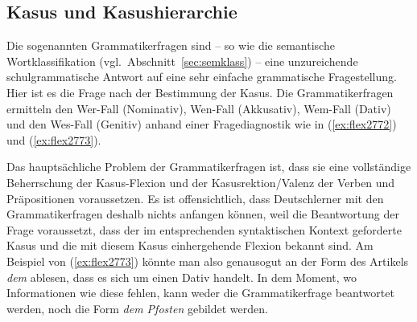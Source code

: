\subsection{Kasus und Kasushierarchie}

\label{sec:kasus}


Die sogenannten Grammatikerfragen sind -- so wie die semantische Wortklassifikation (vgl.\ Abschnitt~\ref{sec:semklass}) -- eine unzureichende schulgrammatische Antwort auf eine sehr einfache grammatische Fragestellung.
Hier ist es die Frage nach der Bestimmung der Kasus.
Die Grammatikerfragen ermitteln den Wer-Fall (Nominativ), Wen-Fall (Akkusativ), Wem-Fall (Dativ) und den Wes-Fall (Genitiv) anhand einer Fragediagnostik wie in (\ref{ex:flex2772}) und (\ref{ex:flex2773}).

\begin{exe}
  \ex \label{ex:flex2772}
  \begin{xlist}
  \end{xlist}
  \ex \label{ex:flex2773}
  \begin{xlist}
  \end{xlist}
\end{exe}

Das hauptsächliche Problem der Grammatikerfragen ist, dass sie eine vollständige Beherrschung der Kasus-Flexion und der Kasusrektion\slash Valenz der Verben und Präpositionen voraussetzen.
Es ist offensichtlich, dass \zB Deutschlerner mit den Grammatikerfragen deshalb nichts anfangen können, weil die Beantwortung der Frage voraussetzt, dass der im entsprechenden syntaktischen Kontext geforderte Kasus und die mit diesem Kasus einhergehende Flexion bekannt sind.
Am Beispiel von (\ref{ex:flex2773}) könnte man also genausogut an der Form des Artikels \textit{dem} ablesen, dass es sich um einen Dativ handelt.
In dem Moment, wo Informationen wie diese fehlen, kann weder die Grammatikerfrage beantwortet werden, noch die Form \textit{dem Pfosten} gebildet werden.

